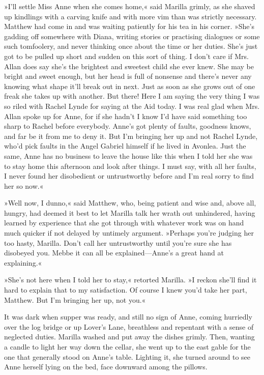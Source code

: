 »I'll settle Miss Anne when she comes home,« said Marilla grimly, as she shaved up kindlings with a carving knife and with more vim than was strictly necessary. Matthew had come in and was waiting patiently for his tea in his corner. »She's gadding off somewhere with Diana, writing stories or practising dialogues or some such tomfoolery, and never thinking once about the time or her duties. She's just got to be pulled up short and sudden on this sort of thing. I don't care if Mrs. Allan does say she's the brightest and sweetest child she ever knew. She may be bright and sweet enough, but her head is full of nonsense and there's never any knowing what shape it'll break out in next. Just as soon as she grows out of one freak she takes up with another. But there! Here I am saying the very thing I was so riled with Rachel Lynde for saying at the Aid today. I was real glad when Mrs. Allan spoke up for Anne, for if she hadn't I know I'd have said something too sharp to Rachel before everybody. Anne's got plenty of faults, goodness knows, and far be it from me to deny it. But I'm bringing her up and not Rachel Lynde, who'd pick faults in the Angel Gabriel himself if he lived in Avonlea. Just the same, Anne has no business to leave the house like this when I told her she was to stay home this afternoon and look after things. I must say, with all her faults, I never found her disobedient or untrustworthy before and I'm real sorry to find her so now.«

»Well now, I dunno,« said Matthew, who, being patient and wise and, above all, hungry, had deemed it best to let Marilla talk her wrath out unhindered, having learned by experience that she got through with whatever work was on hand much quicker if not delayed by untimely argument. »Perhaps you're judging her too hasty, Marilla. Don't call her untrustworthy until you're sure she has disobeyed you. Mebbe it can all be explained—Anne's a great hand at explaining.«

»She's not here when I told her to stay,« retorted Marilla. »I reckon she'll find it hard to explain that to my satisfaction. Of course I knew you'd take her part, Matthew. But I'm bringing her up, not you.«

It was dark when supper was ready, and still no sign of Anne, coming hurriedly over the log bridge or up Lover's Lane, breathless and repentant with a sense of neglected duties. Marilla washed and put away the dishes grimly. Then, wanting a candle to light her way down the cellar, she went up to the east gable for the one that generally stood on Anne's table. Lighting it, she turned around to see Anne herself lying on the bed, face downward among the pillows.

